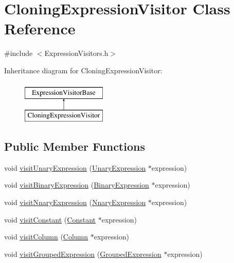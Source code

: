 \hypertarget{class_cloning_expression_visitor}{\section{Cloning\+Expression\+Visitor Class Reference}
\label{class_cloning_expression_visitor}
}


{\ttfamily \#include $<$Expression\+Visitors.\+h$>$}

Inheritance diagram for Cloning\+Expression\+Visitor\+:\begin{figure}[H]
\begin{center}
\leavevmode
\includegraphics[height=2.000000cm]{class_cloning_expression_visitor}
\end{center}
\end{figure}
\subsection*{Public Member Functions}
\begin{DoxyCompactItemize}
\item 
void \hyperlink{class_cloning_expression_visitor_a5eef4362b38190ddadda4c3a6c530475}{visit\+Unary\+Expression} (\hyperlink{class_unary_expression}{Unary\+Expression} $\ast$expression)
\item 
void \hyperlink{class_cloning_expression_visitor_a6a7ba77a1e2b18837d5968d8c9c6e1bc}{visit\+Binary\+Expression} (\hyperlink{class_binary_expression}{Binary\+Expression} $\ast$expression)
\item 
void \hyperlink{class_cloning_expression_visitor_ac09c5ce926f720992e6799b39625fbc2}{visit\+Nnary\+Expression} (\hyperlink{class_nnary_expression}{Nnary\+Expression} $\ast$expression)
\item 
void \hyperlink{class_cloning_expression_visitor_af88937b26b66507f653a0370f51e2fa1}{visit\+Constant} (\hyperlink{class_constant}{Constant} $\ast$expression)
\item 
void \hyperlink{class_cloning_expression_visitor_aae3630ba345d058f2b1be2ae6c83340c}{visit\+Column} (\hyperlink{class_column}{Column} $\ast$expression)
\item 
void \hyperlink{class_cloning_expression_visitor_af5bd6b26028188a7a582a2236342e339}{visit\+Grouped\+Expression} (\hyperlink{class_grouped_expression}{Grouped\+Expression} $\ast$expression)
\end{DoxyCompactItemize}
